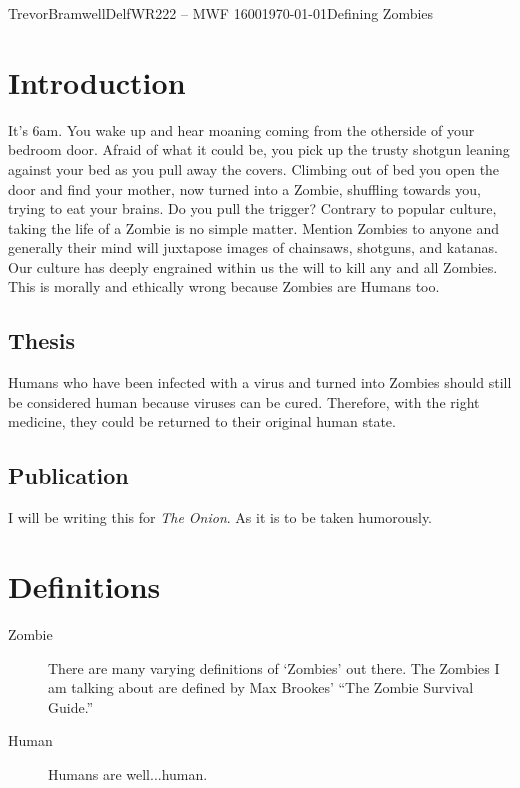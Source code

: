 \documentclass[12pt,letterpaper]{article}
\begin{document}
\begin{mla}{Trevor}{Bramwell}{Delf}{WR222 -- MWF 1600}{\today}{Defining Zombies}

\section*{Introduction}
It's 6am. You wake up and hear moaning coming from the otherside of your
bedroom door. Afraid of what it could be, you pick up the trusty shotgun
leaning against your bed as you pull away the covers. Climbing out of bed
you open the door and find your mother, now turned into a Zombie, shuffling
towards you, trying to eat your brains. Do you pull the trigger?
Contrary to popular culture, taking the life of a Zombie is no simple matter.
Mention Zombies to anyone and generally their mind will juxtapose images of
chainsaws, shotguns, and katanas. Our culture has deeply engrained within us
the will to kill any and all Zombies. This is morally and ethically wrong
because Zombies are Humans too.

\subsection*{Thesis}
Humans who have been infected with a virus and turned into Zombies should
still be considered human because viruses can be cured. Therefore, with the
right medicine, they could be returned to their original human state.




\subsection*{Publication}
I will be writing this for \emph{The Onion}. As it is to be taken humorously.

\section*{Definitions}
    \begin{description}
        \item[Zombie]{There are many varying definitions of `Zombies' out there. The Zombies I am
        talking about are defined by Max Brookes' ``The Zombie Survival Guide.''}
        \item[Human]{Humans are well...human.}
    \end{description}




\end{mla}
\end{document}
